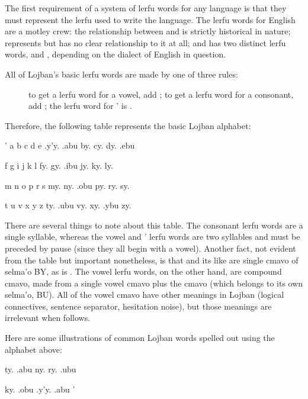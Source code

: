 The first requirement of a system of lerfu words for any
    language is that they must represent the lerfu used to write
    the language. The lerfu words for English are a motley crew:
    the relationship between  and  is strictly
    historical in nature;  represents  but has no
    clear relationship to it at all; and  has two distinct
    lerfu words,  and , depending on the dialect of
    English in question.

All of Lojban's basic lerfu words are made by one of three
    rules:
\begin{description}
\item[] to get a lerfu word for a vowel, add ; to get a lerfu word for a consonant, add ; the lerfu word for \q{}' is .
\end{description}

Therefore, the following table represents the basic Lojban
    alphabet: 

   '   a   b   c   d   e
    .y'y.   .abu    by. cy. dy. .ebu

f   g   i   j   k   l
    fy. gy. .ibu    jy. ky. ly.

m   n   o   p   r   s
    my. ny. .obu    py. ry. sy.

t   u   v   x   y   z
    ty. .ubu    vy. xy. .ybu    zy.

There are several things to note about this table. The
    consonant lerfu words are a single syllable, whereas the vowel
    and \q{}' lerfu words are two syllables and must be preceded by
    pause (since they all begin with a vowel). Another fact, not
    evident from the table but important nonetheless, is that
     and its like are single cmavo of selma'o BY, as is
    . The vowel lerfu words, on the other hand, are
    compound cmavo, made from a single vowel cmavo plus the cmavo
     (which belongs to its own selma'o, BU). All of the vowel
    cmavo have other meanings in Lojban (logical connectives,
    sentence separator, hesitation noise), but those meanings are
    irrelevant when  follows. 

Here are some illustrations of common Lojban words spelled
    out using the alphabet above:
\begin{example}
ty. .abu ny. ry. .ubu\n
{}    
\end{example}

\begin{example}
ky. .obu .y'y. .abu\n
{}  \q{}' 
\end{example}

